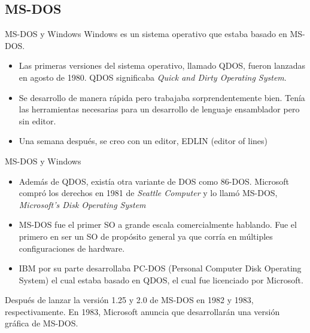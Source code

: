 \documentclass[11pt]{beamer}
\begin{document}
	\subsection{MS-DOS}
		\begin{frame}{MS-DOS y Windows}
			Windows es un sistema operativo que estaba basado en MS-DOS.
			
			\begin{itemize}
				\item Las primeras versiones del sistema operativo, llamado QDOS, fueron lanzadas en agosto de 1980. QDOS significaba \textit{Quick and Dirty Operating System}.
				\item Se desarrollo de manera rápida pero trabajaba sorprendentemente bien. Tenía las herramientas necesarias para un desarrollo de lenguaje ensamblador pero sin editor.
				\item Una semana después, se creo con un editor, EDLIN (editor of lines)
			\end{itemize}
		\end{frame}
		\begin{frame}{MS-DOS y Windows}
			\begin{itemize}
				\item Además de QDOS, existía otra variante de DOS como 86-DOS. Microsoft compró los derechos en 1981 de \textit{Seattle Computer} y lo llamó MS-DOS, \textit{Microsoft's Disk Operating System}
				\item MS-DOS fue el primer SO a grande escala comercialmente hablando. Fue el primero en ser un SO de propósito general ya que corría en múltiples configuraciones de hardware.
				\item IBM por su parte desarrollaba PC-DOS (Personal Computer Disk Operating System) el cual estaba basado en QDOS, el cual fue licenciado por Microsoft.
			\end{itemize}
			Después de lanzar la versión 1.25 y 2.0 de MS-DOS en 1982 y 1983, respectivamente. En 1983, Microsoft anuncia que desarrollarán una versión gráfica de MS-DOS.
		\end{frame}
\end{document}
